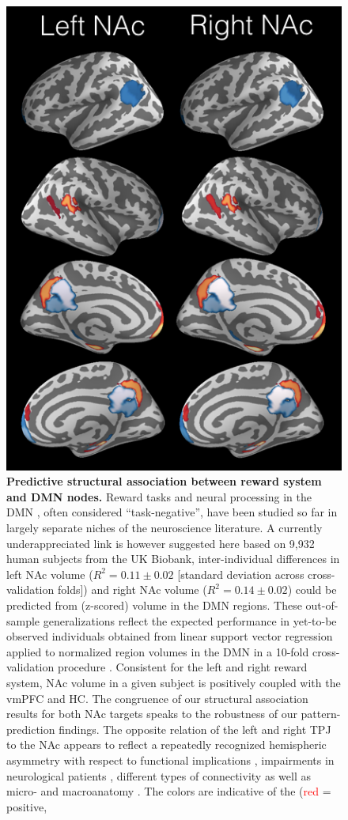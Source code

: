 \documentclass[10pt,letterpaper]{article}
\begin{document}
\begin{figure}[!htbp]
  
  \includegraphics[width=.75\linewidth]{fig_dmn.png}
  \caption{\textbf{Predictive structural association between reward system and
      DMN nodes.} Reward tasks \citep{doherty2015structure} and neural processing in the DMN \citep{randy2008}, often considered ``task-negative'', have been studied so far in largely separate niches of the neuroscience literature. A currently underappreciated link is however suggested here based on 9,932 human subjects from the UK Biobank, inter-individual differences in left NAc volume ($R^2=0.11 \pm 0.02$ [standard deviation across cross-validation folds]) and right NAc volume ($R^2=0.14 \pm 0.02$) could be predicted from (z-scored) volume in the DMN regions. These out-of-sample generalizations reflect the expected performance in yet-to-be observed individuals obtained from linear support vector regression applied to normalized region volumes in the DMN in a 10-fold cross-validation procedure \citep{hastie}.
    Consistent for the left and right reward system, NAc volume in a given subject is
    positively coupled with the vmPFC and HC. The congruence of our structural association results for both NAc targets speaks to the robustness of our pattern-prediction findings. The opposite relation of the left and right TPJ to the NAc appears to reflect a repeatedly recognized hemispheric asymmetry with respect to functional implications \citep{seghier2013angular}, impairments in neurological patients \citep{corbetta2000}, different types of connectivity \citep{uddin_tpj, caspers2011} as well as micro- and macroanatomy \citep{caspers2006, caspers2008}. The colors are indicative of the (\textcolor{red}{red} = positive,
}
\end{figure}
\end{document}
